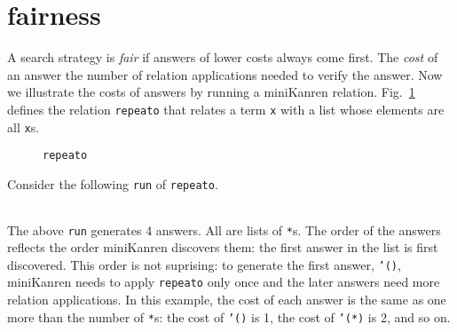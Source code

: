 \documentclass[format=acmlarge, review=true, authordraft=true]{acmart}
\begin{document}
\section{fairness}


A search strategy is \emph{fair} if answers of lower costs always come first. 
The \emph{cost} of an answer the number of relation applications needed to 
verify the answer. Now we illustrate the costs of answers by running a 
miniKanren relation. Fig.~\ref{def-repeato} defines the relation 
\texttt{repeato} that relates a term \texttt{x} with a list whose elements are 
all \texttt{x}s.


\begin{figure}
  
  \caption{\texttt{repeato}}
  \label{def-repeato}
\end{figure}

Consider the following \texttt{run} of \texttt{repeato}.
\begin{center}
  \begin{tabular}{c}
  
   \end{tabular}
\end{center}

The above \texttt{run} generates 4 answers. All are lists of \texttt{*}s.
The order of the answers reflects the order miniKanren discovers them:
the first answer in the list is first discovered. This order is not suprising:
to generate the first answer, \texttt{'()}, miniKanren needs to apply
\texttt{repeato} only once and the later answers need more relation
applications. In this example, the cost of each answer is the same as
one more than the number of \texttt{*}s: the cost of \texttt{'()} is 1,
the cost of \texttt{'(*)} is 2, and so on.

\end{document}
